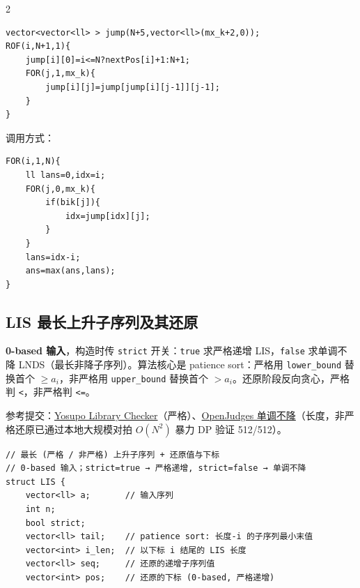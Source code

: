 \begin{multicols*}{2}
		\begin{verbatim}
vector<vector<ll> > jump(N+5,vector<ll>(mx_k+2,0));
ROF(i,N+1,1){
    jump[i][0]=i<=N?nextPos[i]+1:N+1;
    FOR(j,1,mx_k){
        jump[i][j]=jump[jump[i][j-1]][j-1];
    }
}
		\end{verbatim}

		调用方式：

		\begin{verbatim}
FOR(i,1,N){
    ll lans=0,idx=i;
    FOR(j,0,mx_k){
        if(bik[j]){
            idx=jump[idx][j];
        }
    }
    lans=idx-i;
    ans=max(ans,lans);
}
		\end{verbatim}

		\subsection{LIS 最长上升子序列及其还原}

		\textbf{0-based 输入}，构造时传 \texttt{strict} 开关：\texttt{true} 求严格递增 LIS，\texttt{false} 求单调不降 LNDS（最长非降子序列）。算法核心是 patience sort：严格用 \texttt{lower\_bound} 替换首个 $\geq a_i$，非严格用 \texttt{upper\_bound} 替换首个 $> a_i$。还原阶段反向贪心，严格判 \texttt{<}，非严格判 \texttt{<=}。

		参考提交：\href{https://judge.yosupo.jp/submission/327571}{Yosupo Library Checker}（严格）、\href{https://judge.yosupo.jp/submission/370233}{OpenJudges 单调不降}（长度，非严格还原已通过本地大规模对拍 \(O(N^2)\) 暴力 DP 验证 512/512）。

		\begin{verbatim}
// 最长 (严格 / 非严格) 上升子序列 + 还原值与下标
// 0-based 输入；strict=true → 严格递增, strict=false → 单调不降
struct LIS {
    vector<ll> a;       // 输入序列
    int n;
    bool strict;
    vector<ll> tail;    // patience sort: 长度-i 的子序列最小末值
    vector<int> i_len;  // 以下标 i 结尾的 LIS 长度
    vector<ll> seq;     // 还原的递增子序列值
    vector<int> pos;    // 还原的下标 (0-based, 严格递增)


\end{verbatim}
\end{multicols*}
